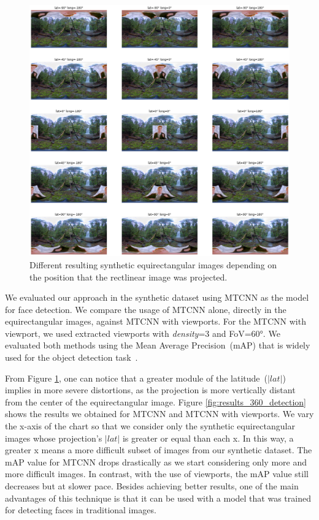 \begin{figure}[!ht]
    \centering
    \includegraphics[width=1\linewidth]{img/video360/different_projections.png}
    \caption{Different resulting synthetic equirectangular images depending on the position that the rectlinear image was projected.}
    \label{fig:different_projections}
\end{figure}

We evaluated our approach in the synthetic dataset using MTCNN\cite{mtcnn} as the model for face detection. We compare the usage of MTCNN alone, directly in the equirectangular images, against MTCNN with viewports. For the MTCNN with viewport, we used extracted viewports with \emph{density}=3 and FoV=60°. We evaluated both methods using the Mean Average Precision~(mAP) that is widely used for the object detection task~\cite{map1, map2, map3, map4}. 


From Figure \ref{fig:different_projections}, one can notice that a greater module of the latitude~($|lat|$) implies in more severe distortions, as the projection is more vertically distant from the center of the equirectangular image. Figure \ref{fig:results_360_detection} shows the results we obtained for MTCNN and MTCNN with viewports. 
We vary the x-axis of the chart so that we consider only the synthetic equirectangular images whose projection's $|lat|$ is greater or equal than each x. In this way, a greater x means a more difficult subset of images from our synthetic dataset. The mAP value for MTCNN drops drastically as we start considering only more and more difficult images. In contrast, with the use of viewports, the mAP value still decreases but at slower pace. Besides achieving better results, one of the main advantages of this technique is that it can be used with a model that was trained for detecting faces in traditional images.

